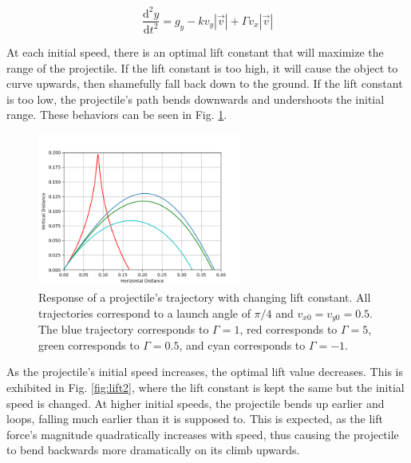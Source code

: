 \documentclass[12pt]{iopart} %
\begin{document}
\begin{equation} \label{eq:5}
  \frac{\mathrm{d}^2 y}{\mathrm{d}t^2} = g_y - k v_y |\vec{v}| + \Gamma v_x |\vec{v}|
\end{equation}

At each initial speed, there is an optimal lift constant that will maximize the range of the projectile.
If the lift constant is too high, it will cause the object to curve upwards, then shamefully fall back down to the ground.
If the lift constant is too low, the projectile's path bends downwards and undershoots the initial range.
These behaviors can be seen in Fig. \ref{fig:lift1}.

\begin{figure}[h!tbp]
  \begin{center}
 \item[]\includegraphics[width=0.6\textwidth]{lift1.png}
  \caption{\label{fig:lift1}
  Response of a projectile's trajectory with changing lift constant.
  All trajectories correspond to a launch angle of $\pi/4$ and $v_{x0} = v_{y0} = 0.5$.
  The blue trajectory corresponds to $\Gamma = 1$, red corresponds to $\Gamma = 5$, green corresponds to $\Gamma = 0.5$, and cyan corresponds to $\Gamma = -1$.
  }
  \end{center}
\end{figure}

As the projectile's initial speed increases, the optimal lift value decreases.
This is exhibited in Fig. \ref{fig:lift2}, where the lift constant is kept the same but the initial speed is changed.
At higher initial speeds, the projectile bends up earlier and loops, falling much earlier than it is supposed to.
This is expected, as the lift force's magnitude quadratically increases with speed, thus causing the projectile to bend backwards more dramatically on its climb upwards.
\end{document}
